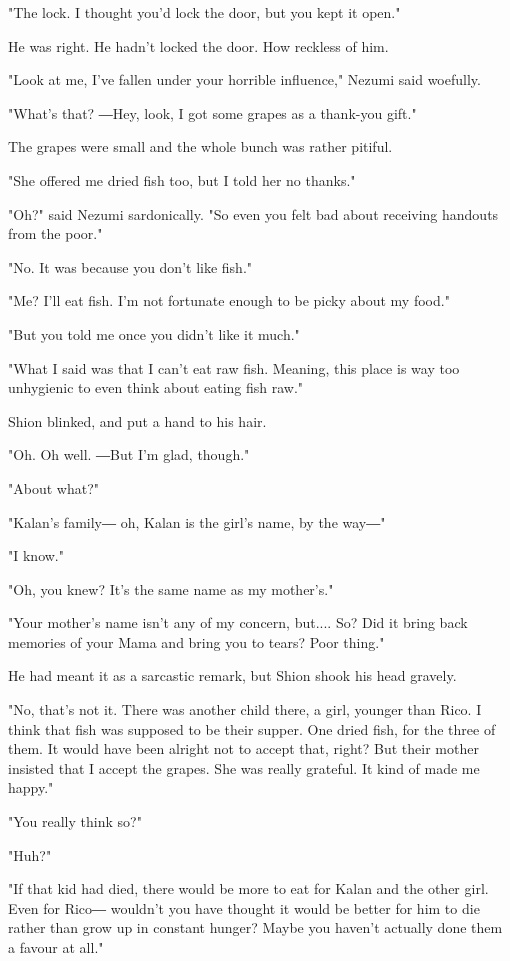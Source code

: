 "The lock. I thought you'd lock the door, but you kept it open."

He was right. He hadn't locked the door. How reckless of him.

"Look at me, I've fallen under your horrible influence," Nezumi said
woefully.

"What's that? ―Hey, look, I got some grapes as a thank-you gift."

The grapes were small and the whole bunch was rather pitiful.

"She offered me dried fish too, but I told her no thanks."

"Oh?" said Nezumi sardonically. "So even you felt bad about receiving
handouts from the poor."

"No. It was because you don't like fish."

"Me? I'll eat fish. I'm not fortunate enough to be picky about my food."

"But you told me once you didn't like it much."

"What I said was that I can't eat raw fish. Meaning, this place is way
too unhygienic to even think about eating fish raw."

Shion blinked, and put a hand to his hair.

"Oh. Oh well. ―But I'm glad, though."

"About what?"

"Kalan's family― oh, Kalan is the girl's name, by the way―"

"I know."

"Oh, you knew? It's the same name as my mother's."

"Your mother's name isn't any of my concern, but.... So? Did it bring
back memories of your Mama and bring you to tears? Poor thing."

He had meant it as a sarcastic remark, but Shion shook his head gravely.

"No, that's not it. There was another child there, a girl, younger than
Rico. I think that fish was supposed to be their supper. One dried fish,
for the three of them. It would have been alright not to accept that,
right? But their mother insisted that I accept the grapes. She was
really grateful. It kind of made me happy."

"You really think so?"

"Huh?"

"If that kid had died, there would be more to eat for Kalan and the
other girl. Even for Rico― wouldn't you have thought it would be better
for him to die rather than grow up in constant hunger? Maybe you haven't
actually done them a favour at all."

